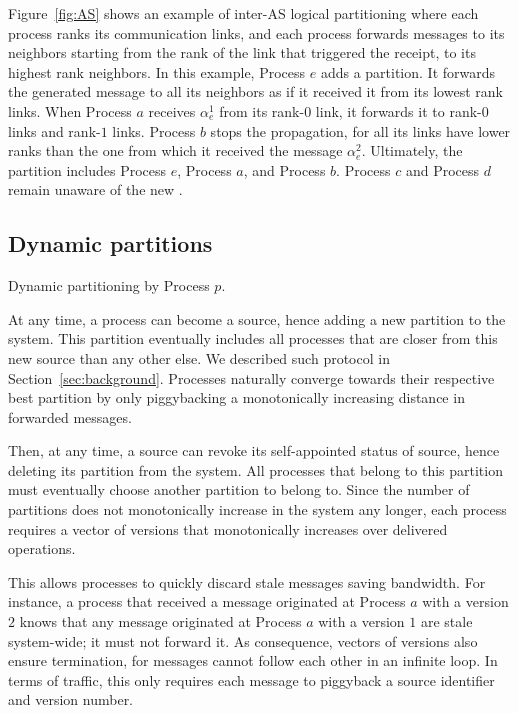 Figure~\ref{fig:AS} shows an example of inter-AS logical partitioning
where each process ranks its communication links, and each process
forwards messages to its neighbors starting from the rank of the link
that triggered the receipt, to its highest rank neighbors. In this
example, Process $e$ adds a partition. It forwards the generated
message to all its neighbors as if it received it from its lowest rank
links. When Process $a$ receives $\alpha_e^1$ from its rank-$0$ link,
it forwards it to rank-$0$ links and rank-$1$ links.  Process $b$
stops the propagation, for all its links have lower ranks than the one
from which it received the message $\alpha_e^2$. Ultimately, the
partition includes Process $e$, Process $a$, and Process $b$. Process
$c$ and Process $d$ remain unaware of the new .


\subsection{Dynamic partitions}

\begin{algorithm}
  
  \caption{\label{algo:adddelundo}Dynamic partitioning by Process $p$.}
\end{algorithm}

At any time, a process can become a source, hence adding a new
partition to the system. This partition eventually includes all
processes that are closer from this new source than any other else. We
described such protocol in Section~\ref{sec:background}. Processes
naturally converge towards their respective best partition by only
piggybacking a monotonically increasing distance in forwarded
messages. %

Then, at any time, a source can revoke its self-appointed status of
source, hence deleting its partition from the system. All processes
that belong to this partition must eventually choose another partition
to belong to. Since the number of partitions does not monotonically
increase in the system any longer, each process requires a vector of
versions that monotonically increases over delivered operations.

This allows processes to quickly discard stale messages saving
bandwidth. For instance, a process that received a message originated
at Process $a$ with a version $2$ knows that any message originated at
Process $a$ with a version $1$ are stale system-wide; it must not
forward it. As consequence, vectors of versions also ensure
termination, for messages  cannot follow each other
in an infinite loop. In terms of traffic, this only requires each
 message to piggyback a source identifier and version
number.

